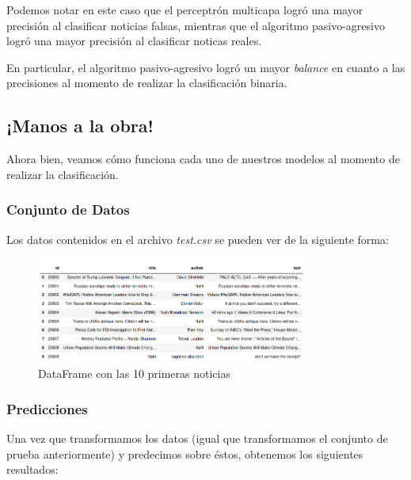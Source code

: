 \documentclass[letterpaper,11pt]{article}
\begin{document}
Podemos notar en este caso que el perceptrón multicapa logró una mayor precisión
al clasificar noticias falsas, mientras que el algoritmo pasivo-agresivo logró 
una mayor precisión al clasificar noticas reales. 

En particular, el algoritmo pasivo-agresivo logró un mayor \textit{balance} en 
cuanto a las precisiones al momento de realizar la clasificación binaria. 

\subsection{¡Manos a la obra!}

Ahora bien, veamos cómo funciona cada uno de nuestros modelos al momento de
realizar la clasificación.

\subsubsection{Conjunto de Datos}

Los datos contenidos en el archivo \textit{test.csv} se pueden ver de la 
siguiente forma:
\begin{figure}[ht]
    \centering
    \includegraphics[width=0.8\textwidth]{imagenes/dataframe2.png}
    \caption{DataFrame con las 10 primeras noticias}
    \label{fig: dataframe2}
\end{figure}

\subsubsection{Predicciones}

Una vez que transformamos los datos (igual que transformamos el conjunto de 
prueba anteriormente) y predecimos sobre éstos, obtenemos los siguientes 
resultados:
\end{document}
